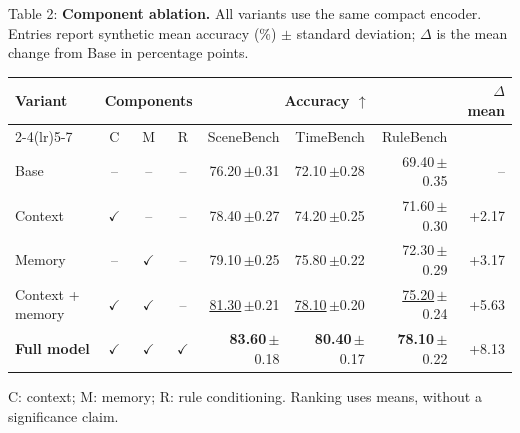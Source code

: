 \documentclass[10pt]{article}
\newcommand{\captext}[3]{\noindent Table #1: \textbf{#2} #3\par\vspace{5pt}}
\newcommand{\unc}[2]{#1\,{\scriptsize\textcolor{quiet}{$\pm$#2}}}
\newcommand{\yes}{$\checkmark$}
\newcommand{\no}{--}
\begin{document}
\captext{2}{Component ablation.}{All variants use the same compact encoder. Entries report synthetic mean accuracy (\%) $\pm$ standard deviation; $\Delta$ is the mean change from Base in percentage points.}
\begin{center}\begin{tabular}{@{}lccc*{3}{r}r@{}}\toprule
\multirow{2}{*}{Variant} & \multicolumn{3}{c}{Components} & \multicolumn{3}{c}{Accuracy $\uparrow$} & \multirow{2}{*}{$\Delta$ mean}\\
\cmidrule(lr){2-4}\cmidrule(lr){5-7}
 & C & M & R & SceneBench & TimeBench & RuleBench & \\\midrule
Base & \no & \no & \no & \unc{76.20}{0.31} & \unc{72.10}{0.28} & \unc{69.40}{0.35} & -- \\
Context & \yes & \no & \no & \unc{78.40}{0.27} & \unc{74.20}{0.25} & \unc{71.60}{0.30} & +2.17 \\
Memory & \no & \yes & \no & \unc{79.10}{0.25} & \unc{75.80}{0.22} & \unc{72.30}{0.29} & +3.17 \\
Context + memory & \yes & \yes & \no & \unc{\underline{81.30}}{0.21} & \unc{\underline{78.10}}{0.20} & \unc{\underline{75.20}}{0.24} & +5.63 \\
\rowcolor{sectiongray}
\textbf{Full model} & \yes & \yes & \yes & \unc{\textbf{83.60}}{0.18} & \unc{\textbf{80.40}}{0.17} & \unc{\textbf{78.10}}{0.22} & +8.13 \\
\bottomrule\end{tabular}\end{center}
{\footnotesize C: context; M: memory; R: rule conditioning. Ranking uses means, without a significance claim.}
\end{document}

